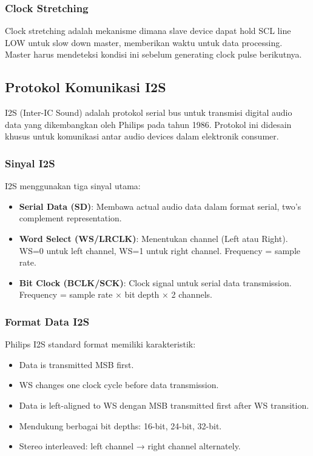 \subsubsection{Clock Stretching}

Clock stretching adalah mekanisme dimana slave device dapat hold SCL line LOW untuk slow down master, memberikan waktu untuk data processing. Master harus mendeteksi kondisi ini sebelum generating clock pulse berikutnya.

\subsection{Protokol Komunikasi I2S}

I2S (Inter-IC Sound) adalah protokol serial bus untuk transmisi digital audio data yang dikembangkan oleh Philips pada tahun 1986. Protokol ini didesain khusus untuk komunikasi antar audio devices dalam elektronik consumer.

\subsubsection{Sinyal I2S}

I2S menggunakan tiga sinyal utama:
\begin{itemize}
	\item \textbf{Serial Data (SD)}: Membawa actual audio data dalam format serial, two's complement representation.
	\item \textbf{Word Select (WS/LRCLK)}: Menentukan channel (Left atau Right). WS=0 untuk left channel, WS=1 untuk right channel. Frequency = sample rate.
	\item \textbf{Bit Clock (BCLK/SCK)}: Clock signal untuk serial data transmission. Frequency = sample rate × bit depth × 2 channels.
\end{itemize}

\subsubsection{Format Data I2S}

Philips I2S standard format memiliki karakteristik:
\begin{itemize}
	\item Data is transmitted MSB first.
	\item WS changes one clock cycle before data transmission.
	\item Data is left-aligned to WS dengan MSB transmitted first after WS transition.
	\item Mendukung berbagai bit depths: 16-bit, 24-bit, 32-bit.
	\item Stereo interleaved: left channel → right channel alternately.
\end{itemize}

